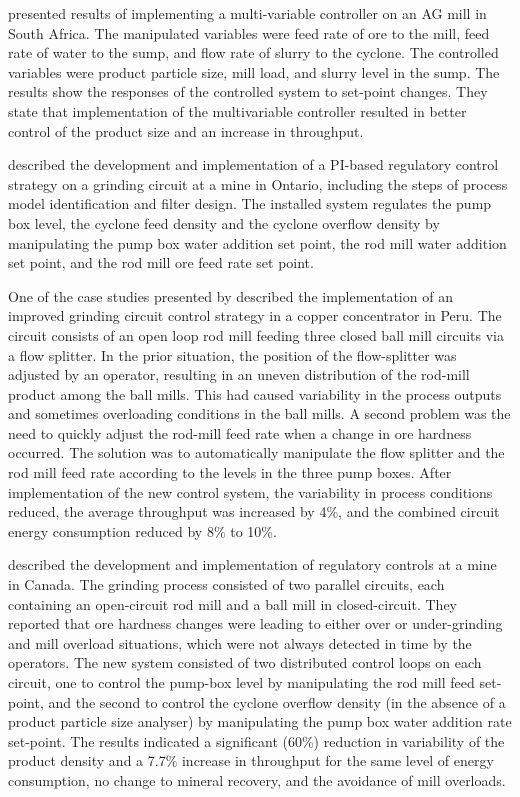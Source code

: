 \cite{hulbert_multivariable_1990} presented results of implementing a multi-variable controller on an AG mill in South Africa. The manipulated variables were feed rate of ore to the mill, feed rate of water to the sump, and flow rate of slurry to the cyclone. The controlled variables were product particle size, mill load, and slurry level in the sump. The results show the responses of the controlled system to set-point changes. They state that implementation of the multivariable controller resulted in better control of the product size and an increase in throughput.

\cite{desbiens_distributed_1997} described the development and implementation of a PI-based regulatory control strategy on a grinding circuit at a mine in Ontario, including the steps of process model identification and filter design. The installed system regulates the pump box level, the cyclone feed density and the cyclone overflow density by manipulating the pump box water addition set point, the rod mill water addition set point, and the rod mill ore feed rate set point.

One of the case studies presented by \cite{desbiens_using_2008} described the implementation of an improved grinding circuit control strategy in a copper concentrator in Peru. The circuit consists of an open loop rod mill feeding three closed ball mill circuits via a flow splitter. In the prior situation, the position of the flow-splitter was adjusted by an operator, resulting in an uneven distribution of the rod-mill product among the ball mills. This had caused variability in the process outputs and sometimes overloading conditions in the ball mills. A second problem was the need to quickly adjust the rod-mill feed rate when a change in ore hardness occurred. The solution was to automatically manipulate the flow splitter and the rod mill feed rate according to the levels in the three pump boxes. After implementation of the new control system, the variability in process conditions reduced, the average throughput was increased by 4\%, and the combined circuit energy consumption reduced by 8\% to 10\%.

\cite{nunez_self-optimizing_2009} described the development and implementation of regulatory controls at a mine in Canada. The grinding process consisted of two parallel circuits, each containing an open-circuit rod mill and a ball mill in closed-circuit. They reported that ore hardness changes were leading to either over or under-grinding and mill overload situations, which were not always detected in time by the operators. The new system consisted of two distributed control loops on each circuit, one to control the pump-box level by manipulating the rod mill feed set-point, and the second to control the cyclone overflow density (in the absence of a product particle size analyser) by manipulating the pump box water addition rate set-point. The results indicated a significant (60\%) reduction in variability of the product density and a 7.7\% increase in throughput for the same level of energy consumption, no change to mineral recovery, and the avoidance of mill overloads.

